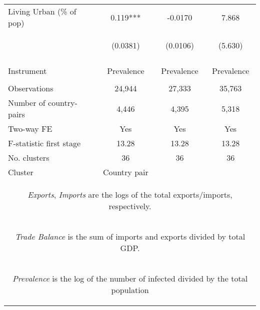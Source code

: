 \documentclass{article}
\begin{document}
\begin{table}[htbp]
{\begin{tabular}{lccc}
Living Urban (\% of pop) & 0.119*** & -0.0170 & 7.868 \\
 & \begin{footnotesize}(0.0381)\end{footnotesize} & \begin{footnotesize}(0.0106)\end{footnotesize} & \begin{footnotesize}(5.630)\end{footnotesize} \\
\vspace{4pt} & \begin{footnotesize}\end{footnotesize} & \begin{footnotesize}\end{footnotesize} & \begin{footnotesize}\end{footnotesize} \\
Instrument & Prevalence & Prevalence & Prevalence \\
\vspace{4pt} & \begin{footnotesize}\end{footnotesize} & \begin{footnotesize}\end{footnotesize} & \begin{footnotesize}\end{footnotesize} \\
Observations & 24,944 & 27,333 & 35,763 \\
Number of country-pairs & 4,446 & 4,395 & 5,318 \\
Two-way FE & Yes & Yes & Yes \\
F-statistic first stage & 13.28 & 13.28 & 13.28 \\
No. clusters & 36 & 36 & 36 \\ 
Cluster & \multicolumn{1}{c}{Country pair} \\ \hline
\multicolumn{4}{c}{\begin{footnotesize} \textit{Exports}, \textit{Imports} are the logs of the total exports/imports, respectively.  \end{footnotesize} }\\
\multicolumn{4}{c}{\begin{footnotesize} \textit{Trade Balance} is the sum of imports and exports divided by total GDP. \end{footnotesize} }\\
\multicolumn{4}{c}{\begin{footnotesize} \textit{Prevalence} is the log of the number of infected divided by the total population \end{footnotesize} }\\

\end{tabular}}
\end{table}
\end{document}
